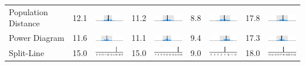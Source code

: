 \begin{table}
\begin{tabular}{l rm{7em} rm{7em} rm{7em} rm{7em}}
Population Distance    &  12.1 &       \includegraphics[width=7em]{mini_hist/TX_senate_2008_dist_p} &  11.2 &       \includegraphics[width=7em]{mini_hist/TX_senate_2012_dist_p} &   8.8 &       \includegraphics[width=7em]{mini_hist/TX_senate_2014_dist_p} &  17.8 &       \includegraphics[width=7em]{mini_hist/TX_senate_2018_dist_p} \\
Power Diagram          &  11.6 &        \includegraphics[width=7em]{mini_hist/TX_senate_2008_power} &  11.1 &        \includegraphics[width=7em]{mini_hist/TX_senate_2012_power} &   9.4 &        \includegraphics[width=7em]{mini_hist/TX_senate_2014_power} &  17.3 &        \includegraphics[width=7em]{mini_hist/TX_senate_2018_power} \\
Split-Line             &  15.0 &        \includegraphics[width=7em]{mini_hist/TX_senate_2008_split_ax} &  15.0 &        \includegraphics[width=7em]{mini_hist/TX_senate_2012_split_ax} &   9.0 &        \includegraphics[width=7em]{mini_hist/TX_senate_2014_split_ax} &  18.0 &        \includegraphics[width=7em]{mini_hist/TX_senate_2018_split_ax} \\

\end{tabular}
\end{table}

